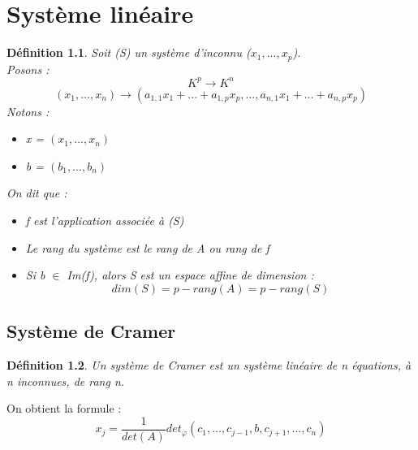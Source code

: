 \documentclass[a4paper,12 pt,oneside]{report}     %
\newtheorem{de}{Définition}
\begin{document}
\chapter{Système linéaire}
\begin{de}
Soit (S) un système d'inconnu ($x_1,...,x_p$).\\
Posons :
$$K^p \rightarrow K^n$$
$$(x_1,...,x_n) \rightarrow (a_{1,1}x_1+...+a_{1,p}x_p,...,a_{n,1}x_1+...+a_{n,p}x_p)$$
Notons : 
\begin{itemize}
 \item[$\rightarrow$] x = $(x_1,...,x_n)$
 \item[$\rightarrow$] b = $(b_1,...,b_n)$
\end{itemize}
On dit que :
\begin{itemize}
 \item[$\rightarrow$] f est l'application associée à (S)
 \item[$\rightarrow$] Le rang du système est le rang de A ou rang de f
 \item[$\rightarrow$] Si b $\in$ Im(f), alors S est un espace affine de dimension : $$ dim(S) = p-rang(A) = p-rang(S)$$
\end{itemize}
\end{de}
\section{Système de Cramer}
\begin{de}
Un système de Cramer est un système linéaire de n équations, à n inconnues, de rang n.
\end{de}
On obtient la formule :
$$x_j = \dfrac{1}{det(A)}det_{\varphi}(c_1,...,c_{j-1},b,c_{j+1},...,c_n)$$
\end{document}
